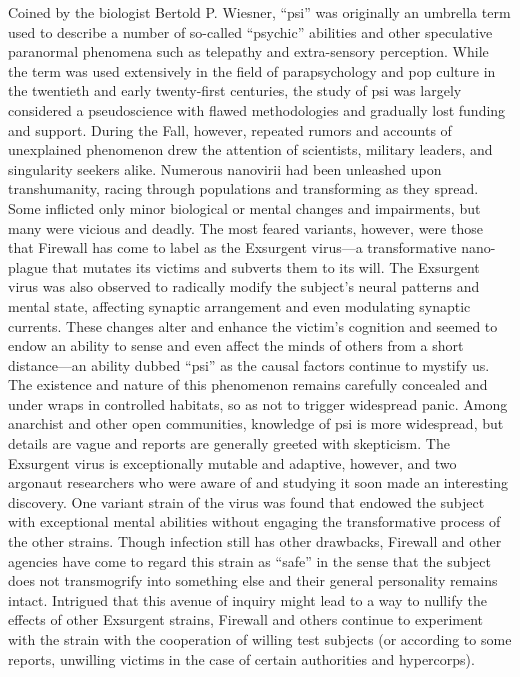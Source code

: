 Coined by the biologist Bertold P. Wiesner,
“psi” was originally an umbrella term
used to describe a number of so-called
“psychic” abilities and other speculative
paranormal phenomena such as telepathy
and extra-sensory perception. While
the term was used extensively in the
field of parapsychology and pop culture
in the twentieth and early twenty-first
centuries, the study of psi was largely
considered a pseudoscience with flawed
methodologies and gradually lost funding
and support.
During the Fall, however, repeated
rumors and accounts of unexplained
phenomenon drew the attention of
scientists, military leaders, and singularity
seekers alike. Numerous nanovirii had
been unleashed upon transhumanity,
racing through populations and transforming
as they spread. Some inflicted
only minor biological or mental changes
and impairments, but many were vicious
and deadly. The most feared variants,
however, were those that Firewall has
come to label as the Exsurgent virus—a
transformative nano-plague that mutates
its victims and subverts them to its will.
The Exsurgent virus was also observed
to radically modify the subject’s neural
patterns and mental state, affecting synaptic
arrangement and even modulating
synaptic currents. These changes alter
and enhance the victim’s cognition and
seemed to endow an ability to sense and
even affect the minds of others from a
short distance—an ability dubbed “psi”
as the causal factors continue to mystify
us. The existence and nature of this phenomenon
remains carefully concealed
and under wraps in controlled habitats,
so as not to trigger widespread panic.
Among anarchist and other open communities,
knowledge of psi is more widespread,
but details are vague and reports
are generally greeted with skepticism.
The Exsurgent virus is exceptionally
mutable and adaptive, however, and two
argonaut researchers who were aware of
and studying it soon made an interesting
discovery. One variant strain of the virus
was found that endowed the subject
with exceptional mental abilities without
engaging the transformative process
of the other strains. Though infection
still has other drawbacks, Firewall and
other agencies have come to regard
this strain as “safe” in the sense that
the subject does not transmogrify into
something else and their general personality
remains intact. Intrigued that this
avenue of inquiry might lead to a way
to nullify the effects of other Exsurgent
strains, Firewall and others continue
to experiment with the strain with the
cooperation of willing test subjects (or
according to some reports, unwilling
victims in the case of certain authorities
and hypercorps).

